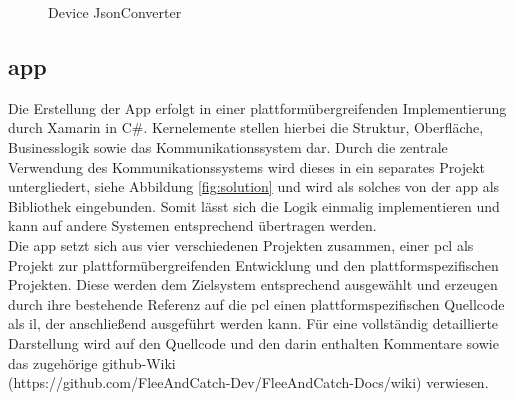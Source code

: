 \begin{figure}[h]
	\centering
	\qquad
	\caption{Device JsonConverter}
\end{figure}

\newpage
\subsection{\gls{app}}

Die Erstellung der App erfolgt in einer plattformübergreifenden Implementierung durch Xamarin in C\#. Kernelemente stellen hierbei die Struktur, Oberfläche, Businesslogik sowie das Kommunikationssystem dar. Durch die zentrale Verwendung des Kommunikationssystems wird dieses in ein separates Projekt untergliedert, siehe Abbildung \ref{fig:solution} und wird als solches von der \gls{app} als Bibliothek eingebunden. Somit lässt sich die Logik einmalig implementieren und kann auf andere Systemen entsprechend übertragen werden.\\
Die \gls{app} setzt sich aus vier verschiedenen Projekten zusammen, einer \acrshort{pcl} als Projekt zur plattformübergreifenden Entwicklung und den plattformspezifischen Projekten. Diese werden dem Zielsystem entsprechend ausgewählt und erzeugen durch ihre bestehende Referenz auf die \acrshort{pcl} einen plattformspezifischen Quellcode als \gls{il}, der anschließend ausgeführt werden kann. Für eine vollständig detaillierte Darstellung wird auf den Quellcode und den darin enthalten Kommentare sowie das zugehörige 
github-Wiki\\(https://github.com/FleeAndCatch-Dev/FleeAndCatch-Docs/wiki) verwiesen.\\

